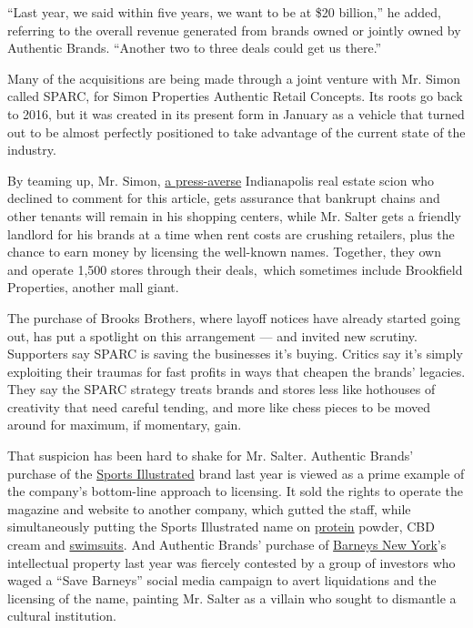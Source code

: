 ``Last year, we said within five years, we want to be at \$20 billion,''
he added, referring to the overall revenue generated from brands owned
or jointly owned by Authentic Brands. ``Another two to three deals could
get us there.''

Many of the acquisitions are being made through a joint venture with Mr.
Simon called SPARC, for Simon Properties Authentic Retail Concepts. Its
roots go back to 2016, but it was created in its present form in January
as a vehicle that turned out to be almost perfectly positioned to take
advantage of the current state of the industry.

By teaming up, Mr. Simon,
\href{https://www.buzzfeednews.com/article/sapna/mall-industry-hires-pr-firm-to-fight-death-of-the-mall-narra}{a
press-averse} Indianapolis real estate scion who declined to comment for
this article, gets assurance that bankrupt chains and other tenants will
remain in his shopping centers, while Mr. Salter gets a friendly
landlord for his brands at a time when rent costs are crushing
retailers, plus the chance to earn money by licensing the well-known
names. Together, they own and operate 1,500 stores through their
deals,~which sometimes include Brookfield Properties, another mall
giant.

The purchase of Brooks Brothers, where layoff notices have already
started going out, has put a spotlight on this arrangement --- and
invited new scrutiny. Supporters say SPARC is saving the businesses it's
buying. Critics say it's simply exploiting their traumas for fast
profits in ways that cheapen the brands' legacies. They say the SPARC
strategy treats brands and stores less like hothouses of creativity that
need careful tending, and more like chess pieces to be moved around for
maximum, if momentary, gain.

That suspicion has been hard to shake for Mr. Salter. Authentic Brands'
purchase of the
\href{https://www.nytimes3xbfgragh.onion/2019/10/03/business/media/sports-illustrated-layoffs.html}{Sports
Illustrated} brand last year is viewed as a prime example of the
company's bottom-line approach to licensing. It sold the rights to
operate the magazine and website to another company, which gutted the
staff, while simultaneously putting the Sports Illustrated name on
\href{https://www.amazon.com/Sports-Illustrated-Nutrition-Protein-Isolate/dp/B087BQSRZK}{protein}
powder, CBD cream and
\href{https://www.venus.com/products.aspx?BRANCH=24~7308~\&sc=FS75\&cm_mmc=SEMNB-_-Google-_-sports\%20illustrated\%20cover-_-Swim-Sports-Illustrated-nc\&gclid=CjwKCAjwyo36BRAXEiwA24CwGQdbioudyHMOgSGBt-IqmeRYAAiUCDWXq5kc6678hfWiG2OmrW07KRoCnXcQAvD_BwE}{swimsuits}.
And Authentic Brands' purchase of
\href{https://www.nytimes3xbfgragh.onion/2019/10/30/business/barneys-bankruptcy.html}{Barneys
New York}'s intellectual property last year was fiercely contested by a
group of investors who waged a ``Save Barneys'' social media campaign to
avert liquidations and the licensing of the name, painting Mr. Salter as
a villain who sought to dismantle a cultural institution.

